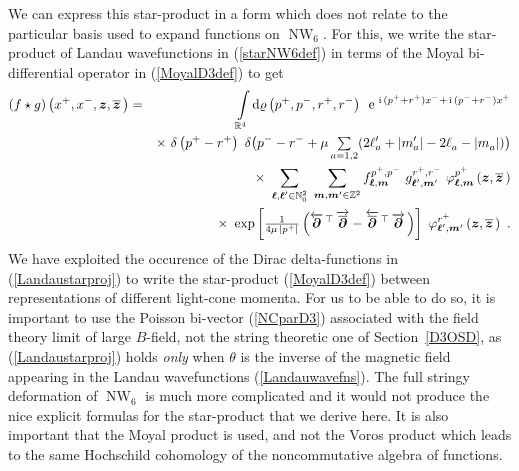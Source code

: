 \documentclass[11pt,a4paper]{article}
\DeclareMathOperator{\NW}{NW}
\newcommand{\ii}{{\rm i}}
\newcommand{\mbf}[1]{{\boldsymbol {#1} }}
\def\ii{{\,{\rm i}\,}}
\def\dd{{\rm d}}
\def\mz{{\mbf z}}
\def\mm{{\mbf m}}
\def\mell{{\mbf\ell}}
\def\mdell{{\mbf\partial}}
\newcommand{\zed}{{\mathbb Z}} %
\newcommand{\nat}{{\mathbb N}} %
\newcommand{\real}{{\mathbb R}} %
\def\e{{\,\rm e}\,}
\def\bea{\begin{eqnarray}}
\def\eea{\end{eqnarray}}
\begin{document}
We can express this star-product in a form which does not relate to
the particular basis used to expand functions on $\NW_6$. For this, we
write the star-product of Landau wavefunctions in (\ref{starNW6def})
in terms of the Moyal bi-differential operator in (\ref{MoyalD3def})
to get
\bea
(f\star g)\left(x^+,x^-,\mz,\overline{\mz}\,\right)&=&
\int\limits_{\real^4}\dd\varrho\left(p^+,p^-,r^+,r^-\right)~
\e^{\ii(p^++r^+)x^-+\ii(p^-+r^-)x^+}
\nonumber\\ &&\times~\delta\left(p^+-r^+\right)~\delta\bigl(p^--r^-+\mu\,
\mbox{$\sum\limits_{a=1,2}$}(2\ell_a'+|m_a'|-2\ell^{~}_a-|m^{~}_a|)\bigr)
\nonumber\\ &&\times~\sum_{\mell,\mell'\in\nat_0^2}~
\sum_{\mm,\mm'\in\zed^2}f_{\mell,\mm}^{p^+,p^-}~
g_{\mell',\mm'}^{r^+,r^-}~\varphi_{\mell,\mm}^{p^+}
\left(\mz,\overline{\mz}\,\right)\nonumber\\ &&
\times~\exp\left[\mbox{$\frac1{4\mu\,
\left|p^+\right|}$}\,\Bigl(\overleftarrow{\mdell}{}^{\,\top}\,
\overrightarrow{\overline{\mdell}}
-\overleftarrow{\overline{\mdell}}{}^{\,\top}\,
\overrightarrow{\mdell}\,\Bigr)\right]~
\varphi_{\mell',\mm'}^{r^+}\left(\mz,\overline{\mz}\,\right) \ .
\label{starNW6bidiff}\eea
We have exploited the occurence of the Dirac delta-functions in
(\ref{Landaustarproj}) to write the star-product (\ref{MoyalD3def})
between representations of different light-cone momenta. For us to be
able to do so, it is important to use the Poisson bi-vector
(\ref{NCparD3}) associated with the field theory limit of large
$B$-field, not the string theoretic one of Section~\ref{D3OSD}, as
(\ref{Landaustarproj}) holds {\it only} when $\theta$ is the inverse
of the magnetic field appearing in the Landau wavefunctions
(\ref{Landauwavefns}). The full stringy deformation of $\NW_6$
is much more complicated and it would not produce the nice explicit
formulas for the star-product that we derive here. It is also
important that the Moyal product is used, and not the Voros
product which leads to the same Hochschild cohomology of the
noncommutative algebra of functions.
\end{document}

